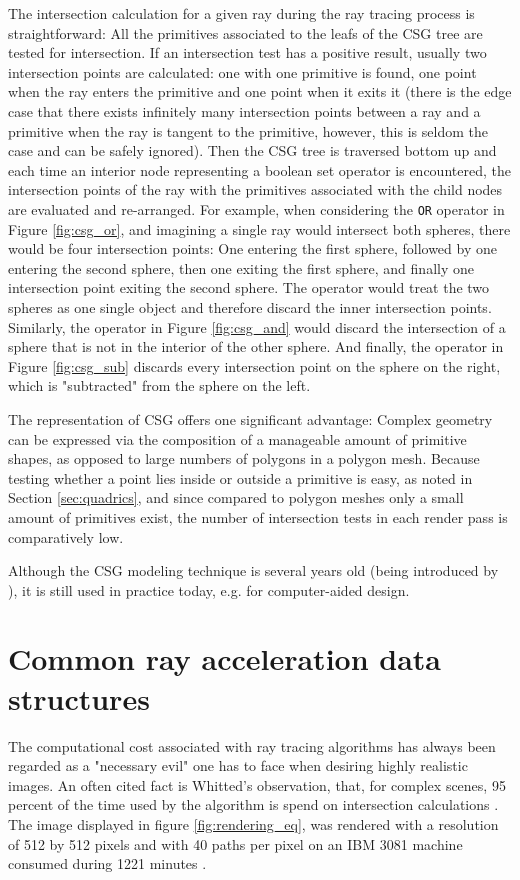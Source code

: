 The intersection calculation for a given ray during the ray tracing process is straightforward: 
All the primitives associated to the leafs of the CSG tree are tested for intersection. If an intersection test has a positive result, usually two intersection points are calculated: one  with one primitive is found, one point when the ray enters the primitive and one point when it exits it (there is the edge case that there exists infinitely many intersection points between a ray and a primitive when the ray is tangent to the primitive, however, this is seldom the case and can be safely ignored). Then the CSG tree is traversed bottom up and each time an interior node representing a boolean set operator is encountered, the intersection points of the ray with the primitives associated with the child nodes are evaluated and re-arranged. For example, when considering the \texttt{OR} operator in Figure \ref{fig:csg_or}, and imagining a single ray would intersect both spheres, there would be four intersection points: One entering the first sphere, followed by one entering the second sphere, then one exiting the first sphere, and finally one intersection point exiting the second sphere. The  operator would treat the two spheres as one single object and therefore discard the inner intersection points. Similarly, the  operator in Figure \ref{fig:csg_and} would discard the intersection of a sphere that is not in the interior of the other sphere. And finally, the  operator in Figure \ref{fig:csg_sub} discards every intersection point on the sphere on the right, which is "subtracted" from the sphere on the left.

The representation of CSG offers one significant advantage: Complex geometry can be expressed via the composition of a manageable amount of primitive shapes, as opposed to large numbers of polygons in a polygon mesh. Because testing whether a point lies inside or outside a primitive is easy, as noted in Section \ref{sec:quadrics}, and since compared to polygon meshes only a small amount of primitives exist, the number of intersection tests in each render pass is comparatively low.

Although the CSG modeling technique is several years old (being introduced by \cite{roth1982ray}), it is still used in practice today, e.g. for computer-aided design.

\section{Common ray acceleration data structures}
The computational cost associated with ray tracing algorithms has always been regarded as a "necessary evil" one has to face when desiring highly realistic images. An often cited fact is Whitted's observation, that, for complex scenes, 95 percent of the time used by the algorithm is spend on intersection calculations \cite[p 349]{whitted1979improved}. The image displayed in figure \ref{fig:rendering_eq}, was rendered with a resolution of 512 by 512 pixels and with 40 paths per pixel on an IBM 3081 machine consumed during 1221 minutes \cite[p 149]{kajiya1986rendering}. 

